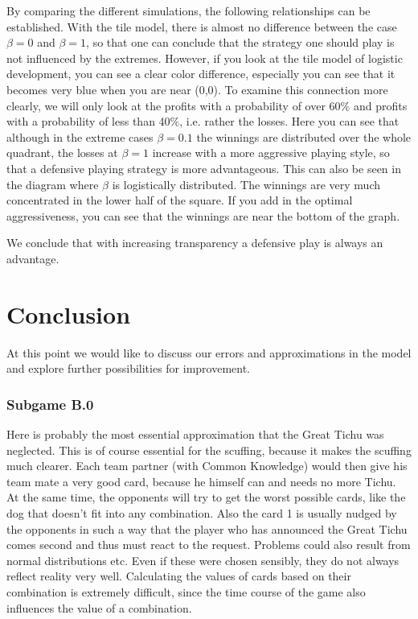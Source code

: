 By comparing the different simulations, the following relationships can be established. With the tile model, there is almost no difference between the case $\beta=0$ and $\beta=1$, so that one can conclude that the strategy one should play is not influenced by the extremes. However, if you look at the tile model of logistic development, you can see a clear color difference, especially you can see that it becomes very blue when you are near (0,0). To examine this connection more clearly, we will only look at the profits with a probability of over 60$\%$ and profits with a probability of less than 40$\%$, i.e. rather the losses. Here you can see that although in the extreme cases $\beta=0.1$ the winnings are distributed over the whole quadrant, the losses at $\beta=1$ increase with a more aggressive playing style, so that a defensive playing strategy is more advantageous. This can also be seen in the diagram where $\beta$ is logistically distributed. The winnings are very much concentrated in the lower half of the square. If you add in the optimal aggressiveness, you can see that the winnings are near the bottom of the graph.

We conclude that with increasing transparency a defensive play is always an advantage.


\section{Conclusion}
At this point we would like to discuss our errors and approximations in the model and explore further possibilities for improvement.

\subsubsection{Subgame B.0}
Here is probably the most essential approximation that the Great Tichu was neglected. This is of course essential for the scuffing, because it makes the scuffing much clearer. Each team partner (with Common Knowledge) would then give his team mate a very good card, because he himself can and needs no more Tichu. At the same time, the opponents will try to get the worst possible cards, like the dog that doesn't fit into any combination. Also the card 1 is usually nudged by the opponents in such a way that the player who has announced the Great Tichu comes second and thus must react to the request.
Problems could also result from normal distributions etc. Even if these were chosen sensibly, they do not always reflect reality very well. Calculating the values of cards based on their combination is extremely difficult, since the time course of the game also influences the value of a combination.

